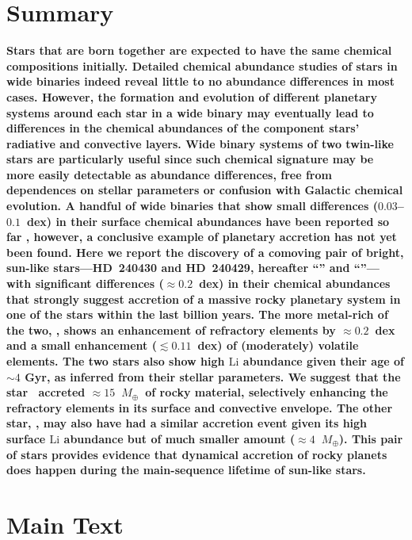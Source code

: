 \documentclass[12pt,letterpaper,margin=1in]{article}
\newcommand*\elem[1]{\ensuremath{\mathrm{#1}}}
\newcommand{\sunanalog}{\text{Krios}}
\newcommand{\bizarreone}{\text{Kronos}}
\newcommand{\mearth}{\ensuremath{M_\oplus}}
\begin{document}
\section{Summary}
{\bf \noindent
  Stars that are born together are expected to have the same chemical
  compositions initially.
  Detailed chemical abundance studies of stars in wide binaries indeed reveal
  little to no abundance differences in most
  cases\citep{Gratton:2001aa,Desidera:2004aa}.
  However, the formation and evolution of different planetary systems around
  each star in a wide binary may eventually lead to differences in the chemical
  abundances of the component stars' radiative and convective
  layers\cite{Pinsonneault:2001aa,Chambers:2010aa}.
  Wide binary systems of two twin-like stars are particularly useful since such
  chemical signature may be more easily detectable as abundance differences,
  free from dependences on stellar parameters or confusion with Galactic
  chemical evolution.
  A handful of wide binaries that show small differences ($0.03$--$0.1$~dex)
  in their surface chemical abundances have been reported so far
  \cite{Mack:2014aa,Mack:2016aa,Saffe:2015aa,Teske:2013aa,
    Teske:2015aa,Teske:2016aa,Teske:2016ab,Biazzo:2015aa,Ramirez:2015aa},
  however, a conclusive example of planetary accretion has not yet been found.
  Here we report the discovery of a comoving pair of bright, sun-like
  stars---HD~240430 and HD~240429, hereafter ``\bizarreone'' and
  ``\sunanalog''--- with significant differences ($\approx 0.2$~dex) in their
  chemical abundances that strongly suggest accretion of a massive rocky
  planetary system in one of the stars within the last billion years.
  The more metal-rich of the two, \bizarreone, shows an enhancement of refractory
  elements by $\approx 0.2$~dex and a small enhancement ($\lesssim 0.11$~dex) of
  (moderately) volatile elements.
  The two stars also show high \elem{Li} abundance given their age of $\sim 4$ Gyr,
  as inferred from their stellar parameters.
  We suggest that the star \bizarreone\ accreted
  $\approx 15$~\mearth\ of rocky material, selectively enhancing the
  refractory elements in its surface and convective envelope.
  The other star, \sunanalog, may also have had a similar accretion
  event given its high surface \elem{Li} abundance but of much smaller amount
  ($\approx 4$~\mearth).
  This pair of stars provides evidence that dynamical accretion of rocky planets
  does happen during the main-sequence lifetime of sun-like stars.
}

\section{Main Text}
\end{document}

